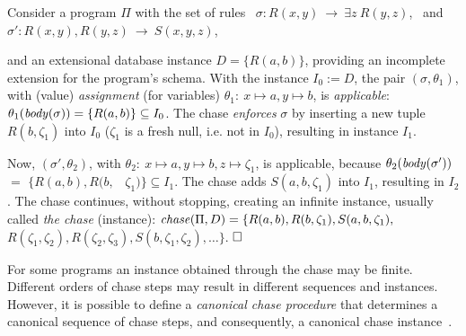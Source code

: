 \documentclass[format=acmsmall, review=false, screen=true]{acmart}
\newcommand{\ignore}[1]{}
\newcommand{\boxtheorem}{\ensuremath{\hfill \Box}}
\newcommand{\nit}[1]{{\it #1}}
\newcommand{\egd}{{\em egd}}
\newcommand{\red}[1]{{#1}}
\newcommand{\blue}[1]{{#1}}
\newcommand{\comlb}[1]{{\vspace{2mm}\noindent \bf \blue{COMM(LEO):}}~ #1 \hfill {\bf
    END.}\\}
\newcommand{\commos}[1]{{\vspace{2mm}\noindent \bf \blue{COMM(MOSTAFA):}}~ #1 \hfill {\bf
    END.}\\}
\begin{document}
\begin{example} \label{ex:chaseNEW} Consider a program $\Pi$ with the set of rules \ $\sigma\!:  R(x,y) \ \rightarrow \ \exists z \ R(y,z)$, \ and \
$\sigma'\!:  R(x,y),R(y,z) \ \rightarrow \ S(x,y,z)$,
\ignore{\vspace{-4mm}
\begin{align*}
\sigma&:&\hspace{-2cm}R(x,y) \! ~&\rightarrow~ \! \exists z \ R(y,z),\\
\sigma'&:&\hspace{-2cm}R(x,y),R(y,z) \! ~&\rightarrow~ \! S(x,y,z),
\end{align*}  }
and an extensional database instance $\red{D}=\{R(a,b)\}$, providing an incomplete extension for the program's schema.
With the instance $I_0:=\red{D}$, the pair $(\sigma, \theta_1)$, with (value) {\em assignment} (for variables) $\theta_1\!: \ x\mapsto a, y\mapsto b$, is {\em applicable}: $\theta_1(\nit{body}(\sigma))=\{R(a,b)\} \subseteq I_0$. The chase {\em enforces} $\sigma$ by inserting a new tuple $R(b,\zeta_1)$ into $I_0$ ($\zeta_1$ is a fresh null, i.e. not in $I_0$), resulting in instance $I_1$. %

Now, $(\sigma',\theta_2)$, with $\theta_2\!: \ x\mapsto a, y\mapsto b, z\mapsto \zeta_1$, is applicable, because $\theta_2(\nit{body}(\sigma'))$ $=$ $\{R(a,b),R(b,$ \ $\zeta_1)\} \subseteq I_1$. The chase adds $S(a,b,\zeta_1)$ into $I_1$, resulting in $I_2$.
The chase continues, without stopping, creating an infinite instance, usually called {\em the chase} (instance): ${\it chase}(\Pi,\red{D}) = \{R(a,b), R(b,\zeta_1), S(a,b,\zeta_1),$ \ $ R(\zeta_1,\zeta_2), R(\zeta_2,\zeta_3), S(b,\zeta_1,\zeta_2), \ldots\}$.
\boxtheorem
\end{example}
For some programs an instance obtained through the chase may be finite. Different orders of chase steps may result in different sequences and instances. However, it is possible to define a {\em canonical chase procedure} that determines  a  canonical sequence of chase steps, and consequently, a canonical chase instance~\cite{cali13}. %


\end{document}
